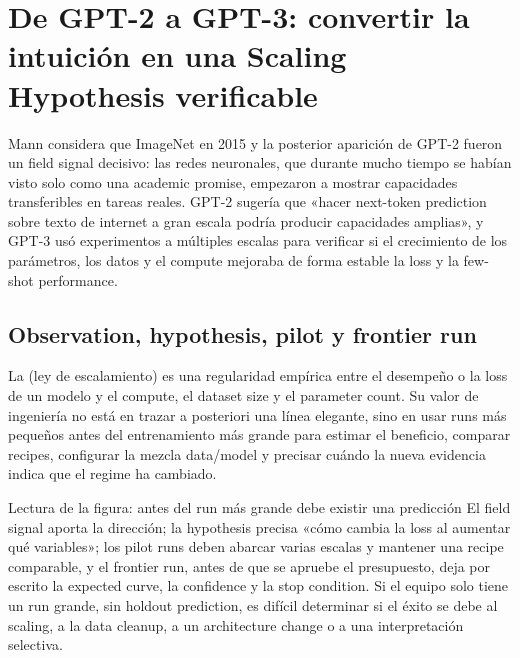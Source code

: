 \section{De GPT-2 a GPT-3: convertir la intuición en una Scaling Hypothesis verificable}

Mann considera que ImageNet en 2015 y la posterior aparición de GPT-2 fueron un field signal decisivo: las redes neuronales, que durante mucho tiempo se habían visto solo como una academic promise, empezaron a mostrar capacidades transferibles en tareas reales. GPT-2 sugería que «hacer next-token prediction sobre texto de internet a gran escala podría producir capacidades amplias», y GPT-3 usó experimentos a múltiples escalas para verificar si el crecimiento de los parámetros, los datos y el compute mejoraba de forma estable la loss y la few-shot performance.

\subsection{Observation, hypothesis, pilot y frontier run}

La  (ley de escalamiento) es una regularidad empírica entre el desempeño o la loss de un modelo y el compute, el dataset size y el parameter count. Su valor de ingeniería no está en trazar a posteriori una línea elegante, sino en usar runs más pequeños antes del entrenamiento más grande para estimar el beneficio, comparar recipes, configurar la mezcla data/model y precisar cuándo la nueva evidencia indica que el regime ha cambiado.


\begin{knowledgebox}{Lectura de la figura: antes del run más grande debe existir una predicción}
El field signal aporta la dirección; la hypothesis precisa «cómo cambia la loss al aumentar qué variables»; los pilot runs deben abarcar varias escalas y mantener una recipe comparable, y el frontier run, antes de que se apruebe el presupuesto, deja por escrito la expected curve, la confidence y la stop condition. Si el equipo solo tiene un run grande, sin holdout prediction, es difícil determinar si el éxito se debe al scaling, a la data cleanup, a un architecture change o a una interpretación selectiva.
\end{knowledgebox}

